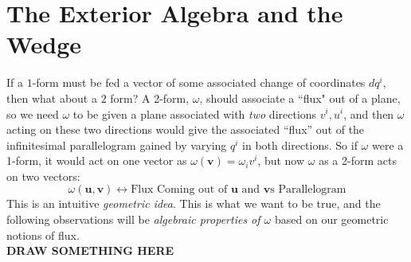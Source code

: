 	
	
	
	\section{The Exterior Algebra and the Wedge} %
	\label{sec:the_exterior_algebra_and_the_wedge}
	
	If a $1$-form must be fed a vector of some associated change of coordinates $dq^i$, then what about a $2$ form? A 2-form, $\omega$, should associate a ``flux" out of a plane, so we need $\omega$ to be given a plane associated with \emph{two} directions $v^i, u^i$, and then $\omega$ acting on these two directions would give the associated ``flux'' out of the infinitesimal parallelogram gained by varying $q^i$ in both directions. So if $\omega$ were a 1-form, it would act on one vector as $\omega(\mathbf v)=\omega_i v^i$, but now $\omega$ as a 2-form acts on two vectors:
	\begin{equation*}
		\omega(\mathbf u, \mathbf v) \longleftrightarrow \text{Flux Coming out of $\mathbf u$ and $\mathbf v$s Parallelogram}
	\end{equation*}
	This is an intuitive \emph{geometric idea}. This is what we want to be true, and the following observations will be \emph{algebraic properties of $\omega$} based on our geometric notions of flux.\\
	\textbf{DRAW SOMETHING HERE}

